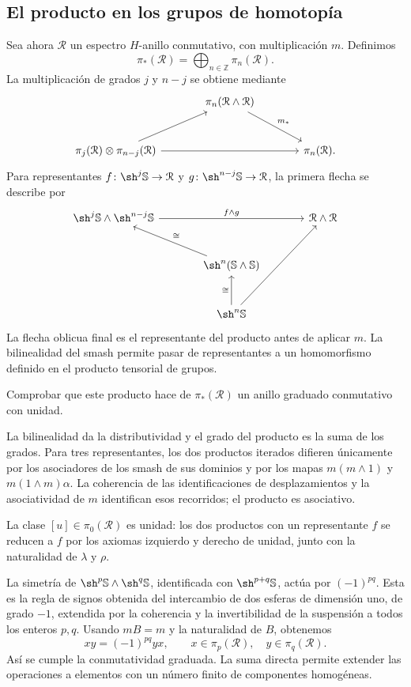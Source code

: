 \subsection{El producto en los grupos de homotopía}
Sea ahora $\mathcal R$ un espectro $H$-anillo conmutativo, con multiplicación $m$. Definimos
\[
\pi_*(\mathcal R)=\bigoplus_{n\in\mathbb Z}\pi_n(\mathcal R).
\]
La multiplicación de grados $j$ y $n-j$ se obtiene mediante
\[
\begin{tikzcd}[column sep=large,row sep=large]
&\pi_n(\mathcal R\wedge\mathcal R)\arrow[dr,"m_*"]&\\
\pi_j(\mathcal R)\otimes\pi_{n-j}(\mathcal R)\arrow[ur]\arrow[rr]&&\pi_n(\mathcal R).
\end{tikzcd}
\]
Para representantes $f\colon\sh^j\mathbb S\to\mathcal R$ y $g\colon\sh^{n-j}\mathbb S\to\mathcal R$, la primera flecha se describe por
\[
\begin{tikzcd}[column sep=large,row sep=large]
\sh^j\mathbb S\wedge\sh^{n-j}\mathbb S\arrow[rr,"f\wedge g"]&&\mathcal R\wedge\mathcal R\\
&\sh^n(\mathbb S\wedge\mathbb S)\arrow[ul,"\cong"']&\\
&\sh^n\mathbb S\arrow[u,"\cong"]\arrow[uur]&
\end{tikzcd}
\]
La flecha oblicua final es el representante del producto antes de aplicar $m$. La bilinealidad del smash permite pasar de representantes a un homomorfismo definido en el producto tensorial de grupos.

\begin{ejer}\label{ejer:c25-anillo-graduado}
Comprobar que este producto hace de $\pi_*(\mathcal R)$ un anillo graduado conmutativo con unidad.
\end{ejer}
\begin{sol}
La bilinealidad da la distributividad y el grado del producto es la suma de los grados. Para tres representantes, los dos productos iterados difieren únicamente por los asociadores de los smash de sus dominios y por los mapas $m(m\wedge1)$ y $m(1\wedge m)\alpha$. La coherencia de las identificaciones de desplazamientos y la asociatividad de $m$ identifican esos recorridos; el producto es asociativo.

La clase $[u]\in\pi_0(\mathcal R)$ es unidad: los dos productos con un representante $f$ se reducen a $f$ por los axiomas izquierdo y derecho de unidad, junto con la naturalidad de $\lambda$ y $\rho$.

La simetría de $\sh^p\mathbb S\wedge\sh^q\mathbb S$, identificada con $\sh^{p+q}\mathbb S$, actúa por $(-1)^{pq}$. Esta es la regla de signos obtenida del intercambio de dos esferas de dimensión uno, de grado $-1$, extendida por la coherencia y la invertibilidad de la suspensión a todos los enteros $p,q$. Usando $mB=m$ y la naturalidad de $B$, obtenemos
\[
xy=(-1)^{pq}yx,
\qquad x\in\pi_p(\mathcal R),\quad y\in\pi_q(\mathcal R).
\]
Así se cumple la conmutatividad graduada. La suma directa permite extender las operaciones a elementos con un número finito de componentes homogéneas.
\end{sol}

